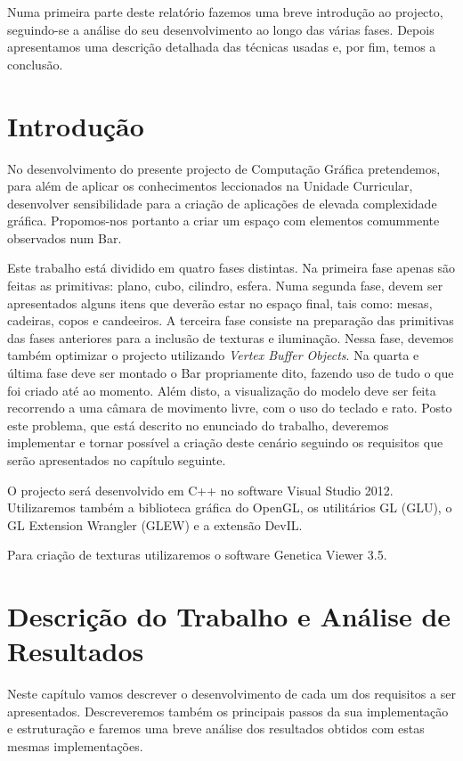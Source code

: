 \documentclass[a5paper,onecolumn, 11pt]{article}
\begin{document}
Numa primeira parte deste relatório fazemos uma breve introdução ao projecto, seguindo-se a análise do seu desenvolvimento ao longo das várias fases. Depois apresentamos uma descrição detalhada das técnicas usadas e, por fim, temos a conclusão.


\clearpage
\section{Introdução}
No desenvolvimento do presente projecto de Computação Gráfica pretendemos, para além de aplicar os conhecimentos leccionados na Unidade Curricular, desenvolver sensibilidade para a criação de aplicações de elevada complexidade gráfica. Propomos-nos portanto a criar um espaço com elementos comummente observados num Bar.

Este trabalho está dividido em quatro fases distintas. Na primeira fase apenas são feitas as primitivas: plano, cubo, cilindro, esfera. Numa segunda fase, devem ser apresentados alguns itens que deverão estar no espaço final, tais como: mesas, cadeiras, copos e candeeiros. A terceira fase consiste na preparação das primitivas das fases anteriores para a inclusão de texturas e iluminação. Nessa fase, devemos também optimizar o projecto utilizando \textit{Vertex Buffer Objects}. Na quarta e última fase deve ser montado o Bar propriamente dito, fazendo uso de tudo o que foi criado até ao momento. Além disto, a visualização do modelo deve ser feita recorrendo a uma câmara de movimento livre, com o uso do teclado e rato. Posto este problema, que está descrito no enunciado do trabalho, deveremos implementar e tornar possível a criação deste cenário seguindo os requisitos que serão apresentados no capítulo seguinte.

O projecto será desenvolvido em C++ no software Visual Studio 2012. Utilizaremos também a biblioteca gráfica do OpenGL, os utilitários GL (GLU), o GL Extension Wrangler (GLEW) e a extensão DevIL.

Para criação de texturas utilizaremos o software Genetica Viewer 3.5.


\clearpage
\newpage
\section{Descrição do Trabalho e Análise de Resultados}
Neste capítulo vamos descrever o desenvolvimento de cada um dos requisitos a ser apresentados. Descreveremos também os principais passos da sua implementação e estruturação e faremos uma breve análise dos resultados obtidos com estas mesmas implementações.
\end{document}
